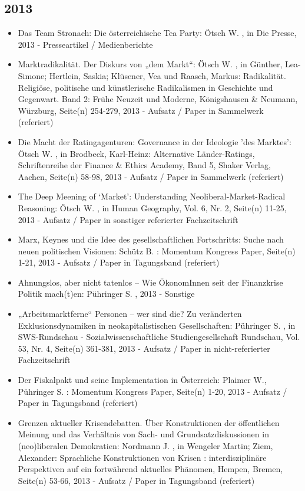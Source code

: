  \subsection{2013} 
 \begin{itemize} 
	 \item Das Team Stronach: Die österreichische Tea Party: Ötsch W. , in Die Presse, 2013 - Presseartikel / Medienberichte
	 \item Marktradikalität. Der Diskurs von „dem Markt“: Ötsch W. , in Günther, Lea-Simone; Hertlein, Saskia;  Klüsener, Vea und Raasch, Markus: Radikalität. Religiöse, politische und künstlerische Radikalismen in Geschichte und Gegenwart.  Band 2: Frühe Neuzeit und Moderne, Königshausen & Neumann, Würzburg, Seite(n) 254-279, 2013 - Aufsatz / Paper in Sammelwerk (referiert)
	 \item Die Macht der Ratingagenturen: Governance in der Ideologie 'des Marktes': Ötsch W. , in Brodbeck, Karl-Heinz: Alternative Länder-Ratings, Schriftenreihe der Finance & Ethics Academy, Band 5, Shaker Verlag, Aachen, Seite(n) 58-98, 2013 - Aufsatz / Paper in Sammelwerk (referiert)
	 \item The Deep Meening of ‘Market’: Understanding Neoliberal-Market-Radical Reasoning: Ötsch W. , in Human Geography, Vol. 6, Nr. 2, Seite(n) 11-25, 2013 - Aufsatz / Paper in sonstiger referierter Fachzeitschrift
	 \item Marx, Keynes und die Idee des gesellschaftlichen Fortschritts: Suche nach neuen politischen Visionen: Schütz B. : Momentum Kongress Paper, Seite(n) 1-21, 2013 - Aufsatz / Paper in Tagungsband (referiert)
	 \item Ahnungslos, aber nicht tatenlos – Wie ÖkonomInnen seit der Finanzkrise Politik mach(t)en: Pühringer S. , 2013 - Sonstige
	 \item „Arbeitsmarktferne“ Personen – wer sind die? Zu veränderten Exklusionsdynamiken in neokapitalistischen Gesellschaften: Pühringer S. , in SWS-Rundschau - Sozialwissenschaftliche Studiengesellschaft Rundschau, Vol. 53, Nr. 4, Seite(n) 361-381, 2013 - Aufsatz / Paper in nicht-referierter Fachzeitschrift
	 \item Der Fiskalpakt und seine Implementation in Österreich: Plaimer W., Pühringer S. : Momentum Kongress Paper, Seite(n) 1-20, 2013 - Aufsatz / Paper in Tagungsband (referiert)
	 \item Grenzen aktueller Krisendebatten. Über Konstruktionen der öffentlichen Meinung und das Verhältnis von Sach- und Grundsatzdiskussionen in (neo)liberalen Demokratien: Nordmann J. , in Wengeler Martin; Ziem, Alexander: Sprachliche Konstruktionen von Krisen : interdisziplinäre Perspektiven auf ein fortwährend aktuelles Phänomen, Hempen, Bremen, Seite(n) 53-66, 2013 - Aufsatz / Paper in Tagungsband (referiert)

\end{itemize}
